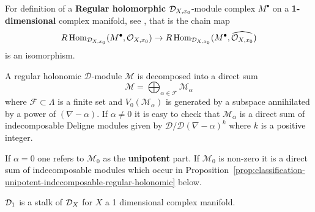 \begin{remark}
    \begin{definition}
        For definition of a \textbf{Regular holomorphic} $\mathcal{D}_{X,x_0}$-module complex $M^\bullet$ on a \textbf{1-dimensional} complex manifold, see \cite[Prop.~5.2.5.]{Bjork1993AnalyticDModules}, that is the chain map
        \[
            R\operatorname{Hom}_{\mathcal{D}_{X,x_0}}(M^\bullet,\mathcal{O}_{X,x_0})\rightarrow  R\operatorname{Hom}_{\mathcal{D}_{X,x_0}}(M^\bullet,\widehat{\mathcal{O}_{X,x_0}})
        \]
        is an isomorphism.
    \end{definition}

    \begin{remark}\label{rmk:indecomposable_objects_in_RH_D}
        \cite[5.2.17 Indecomposable objects in $\textbf{RH}(\mathcal{D})$.]{Bjork1993AnalyticDModules}
        A regular holonomic $\mathcal{D}$-module $\mathcal{M}$ is decomposed into a direct sum
        \[
            \mathcal{M} = \bigoplus_{\alpha \in \mathcal{F}} \mathcal{M}_\alpha
        \]
        where $\mathcal{F} \subset \Lambda$ is a finite set and $V_0(\mathcal{M}_\alpha)$ is generated by a subspace annihilated
        by a power of $(\nabla - \alpha)$. If $\alpha \neq 0$ it is easy to check that $\mathcal{M}_\alpha$ is a direct sum
        of indecomposable Deligne modules given by $\mathcal{D}/\mathcal{D}(\nabla - \alpha)^k$ where $k$ is a positive
        integer.

        If $\alpha = 0$ one refers to $\mathcal{M}_0$ as the \textbf{unipotent} part. If $\mathcal{M}_0$ is non-zero it is a direct
        sum of indecomposable modules which occur in Proposition~\ref{prop:classification-unipotent-indecomposable-regular-holonomic} below.
    \end{remark}

    \begin{proposition}[Classification of unipotent indecomposable regular holonomic $\D :=\mathcal{D}_1$-modules]\label{prop:classification-unipotent-indecomposable-regular-holonomic}
        \cite[Prop~5.2.18.]{Bjork1993AnalyticDModules}
        $\mathcal{D}_1$ is a stalk of $\mathcal{D}_X$ for $X$ a 1 dimensional complex manifold.


\end{proposition}
\end{remark}
